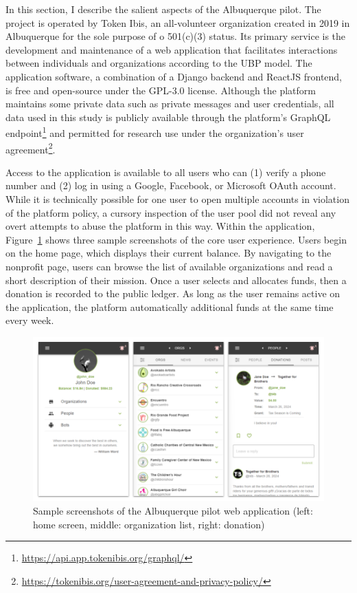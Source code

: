 In this section, I describe the salient aspects of the Albuquerque pilot.
The project is operated by Token Ibis, an all-volunteer organization created in 2019 in Albuquerque for the sole purpose of o 501(c)(3) status.
Its primary service is the development and maintenance of a web application that facilitates interactions between individuals and organizations according to the UBP model.
The application software, a combination of a Django backend and ReactJS frontend, is free and open-source under the GPL-3.0 license.
Although the platform maintains some private data such as private messages and user credentials, all data used in this study is publicly available through the platform's GraphQL endpoint\footnote{\url{https://api.app.tokenibis.org/graphql/}} and permitted for research use under the organization's user agreement\footnote{\url{https://tokenibis.org/user-agreement-and-privacy-policy/}}.

Access to the application is available to all users who can (1) verify a phone number and (2) log in using a Google, Facebook, or Microsoft OAuth account.
While it is technically possible for one user to open multiple accounts in violation of the platform policy, a cursory inspection of the user pool did not reveal any overt attempts to abuse the platform in this way.
Within the application, Figure~\ref{fig:application} shows three sample screenshots of the core user experience.
Users begin on the home page, which displays their current balance.
By navigating to the nonprofit page, users can browse the list of available organizations and read a short description of their mission.
Once a user selects and allocates funds, then a donation is recorded to the public ledger.
As long as the user remains active on the application, the platform automatically additional funds at the same time every week.

\begin{figure}[H]
  \centering
  \includegraphics[width=\linewidth]{figures/application}
  \caption{Sample screenshots of the Albuquerque pilot web application (left: home screen, middle: organization list, right: donation)}
  \label{fig:application}
\end{figure}

